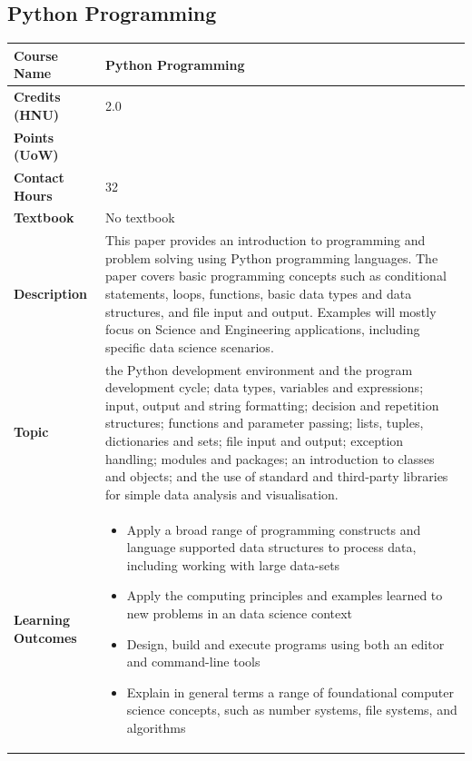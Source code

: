 \documentclass{article}
\begin{document}
\subsection{Python Programming}
\renewcommand{\arraystretch}{1.5} %
\begin{longtable}{|p{3cm}|p{10cm}|}
\hline
\textbf{Course Name} & Python Programming \\
\hline
\textbf{Credits (HNU)} & 2.0 \\
\hline
\textbf{Points (UoW)} & \\
\hline
\textbf{Contact Hours} & 32 \\
\hline
\textbf{Textbook} & No textbook \\
\hline
\textbf{Description} & This paper provides an introduction to programming and problem solving using Python programming languages. The paper covers basic programming concepts such as conditional statements, loops, functions, basic data types and data structures, and file input and output. Examples will mostly focus on Science and Engineering applications, including specific data science scenarios.\\
\hline
\textbf{Topic} & the Python development environment and the program development cycle; data types, variables and expressions; input, output and string formatting; decision and repetition structures; functions and parameter passing; lists, tuples, dictionaries and sets; file input and output; exception handling; modules and packages; an introduction to classes and objects; and the use of standard and third-party libraries for simple data analysis and visualisation. \\
\hline
\textbf{Learning Outcomes} & 
    \begin{itemize}
        \item Apply a broad range of programming constructs and language supported data structures to process data, including working with large data-sets
        \item Apply the computing principles and examples learned to new problems in an data science context
        \item Design, build and execute programs using both an editor and command-line tools
        \item Explain in general terms a range of foundational computer science concepts, such as number systems, file systems, and algorithms
    \end{itemize} \\
\hline
\end{longtable}
\end{document}
